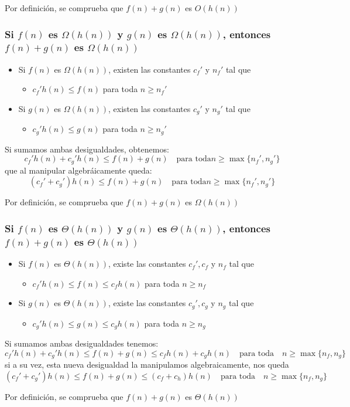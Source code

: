 \documentclass[letterpaper]{article}
\begin{document}
\noindent
Por definición, se comprueba que \(f(n) + g(n)\) es \(O(h(n))\)
\subsubsection{Si \(f(n)\) es \(\Omega(h(n))\) y \(g(n)\) es \(\Omega(h(n))\), entonces \(f(n)+g(n)\) es \(\Omega(h(n))\)}
\label{sec:org4fdfb90}
\begin{itemize}
\item Si \(f(n)\) es \(\Omega(h(n))\), existen las constantes \(c_f'\) y \(n_f'\) tal que
\begin{itemize}
\item \(c_f' h(n) \leq f(n)\) para toda \(n \geq n_f'\)
\end{itemize}
\item Si \(g(n)\) es \(\Omega(h(n))\), existen las constantes \(c_g'\) y \(n_g'\) tal que
\begin{itemize}
\item \(c_g' h(n) \leq g(n)\) para toda \(n \geq n_g'\)
\end{itemize}
\end{itemize}

\noindent
Si sumamos ambas desigualdades, obtenemos:
$$
c_f' h(n) + c_g' h(n) \leq f(n) + g(n) \quad \mbox{para toda}
    n \geq \max\{n_f', n_g'\}
$$
que al manipular algebráicamente queda:
$$
(c_f' + c_g') h(n) \leq f(n) + g(n) \quad \mbox{para toda} n \geq \max\{n_f', n_g'\}
$$

\noindent
Por definición, se comprueba que \(f(n) + g(n)\) es \(\Omega(h(n))\)
\subsubsection{Si \(f(n)\) es \(\Theta(h(n))\) y \(g(n)\) es \(\Theta(h(n))\), entonces \(f(n)+g(n)\) es \(\Theta(h(n))\)}
\label{sec:org0ddcad2}
\begin{itemize}
\item Si \(f(n)\) es \(\Theta(h(n))\), existe las constantes \(c_f', c_f\) y \(n_f\) tal que
\begin{itemize}
\item \(c_f' h(n) \leq f(n) \leq c_f h(n)\) para toda \(n \geq n_f\)
\end{itemize}
\item Si \(g(n)\) es \(\Theta(h(n))\), existe las constantes \(c_g', c_g\) y \(n_g\) tal que
\begin{itemize}
\item \(c_g' h(n) \leq g(n) \leq c_g h(n)\) para toda \(n \geq n_g\)
\end{itemize}
\end{itemize}

\noindent
Si sumamos ambas desigualdades tenemos:
$$
c_f' h(n) + c_g' h(n) \leq f(n) + g(n) \leq c_f h(n) + c_g h(n)
    \quad \mbox{para toda} \quad
    n \geq \max\{n_f, n_g\}
$$
si a su vez, esta nueva desigualdad la manipulamos algebraicamente, nos queda
$$
(c_f' + c_g') h(n) \leq f(n) + g(n) \leq (c_f + c_h) h(n)
    \quad \mbox{para toda} \quad
    n \geq \max\{n_f, n_g\}
$$

\noindent
Por definición, se comprueba que \(f(n) + g(n)\) es \(\Theta(h(n))\)
\end{document}
